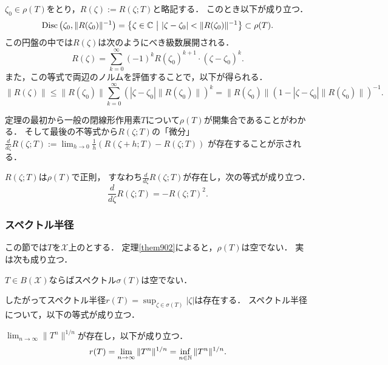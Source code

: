 \documentclass[a4j]{jsarticle}
\newcommand{\spX}{\mathscr{X}}
\begin{document}
    \begin{Them}[定理9.5, p.211]
        $\zeta_0 \in \rho(T)$をとり，$R(\zeta):=R(\zeta;T)$と略記する．
        このとき以下が成り立つ．
        \[
            \mathrm{Disc} \left(\zeta_0, \|R(\zeta_0)\|^{-1} \right)
            =\left\{ \zeta \in \mathbb{C} ~\middle|~ |\zeta-\zeta_0|<\|R(\zeta_0)\|^{-1} \right\}
            \subset \rho(T).
        \]
        この円盤の中では$R(\zeta)$は次のようにべき級数展開される．
        \[ R(\zeta)=\sum_{k=0}^{\infty} (-1)^kR(\zeta_0)^{k+1} \cdot (\zeta-\zeta_0)^k. \]
        また，この等式で両辺のノルムを評価することで，以下が得られる．
        \[
            \|R(\zeta)\|
            \leq \|R(\zeta_0)\| \sum_{k=0}^{\infty}\left( |\zeta-\zeta_0|\|R(\zeta_0)\| \right)^k
            =\|R(\zeta_0)\| (1-|\zeta-\zeta_0|\|R(\zeta_0)\|)^{-1}.
        \]
    \end{Them}
    定理の最初から一般の閉線形作用素$T$について$\rho(T)$が開集合であることがわかる．
    そして最後の不等式から$R(\zeta;T)$の「微分」$\frac{d}{d \zeta}R(\zeta;T):=\lim_{h \to 0}\frac{1}{h} (R(\zeta+h;T)-R(\zeta;T))$
    が存在することが示される．

    \begin{Them}[定理9.6, p.212]
        $R(\zeta;T)$は$\rho(T)$で正則，
        すなわち$\frac{d}{d \zeta}R(\zeta;T)$が存在し，次の等式が成り立つ．
        \[ \frac{d}{d \zeta}R(\zeta;T)=-R(\zeta;T)^2. \]
    \end{Them}

    \subsubsection{スペクトル半径}
    この節では$T$を$\spX$上のとする．
    定理\ref{them902}によると，$\rho(T)$は空でない．
    実は次も成り立つ．
    \begin{Them}[定理9.8, p.213]
        $T \in B(\spX)$ならばスペクトル$\sigma(T)$は空でない．
    \end{Them}
    したがってスペクトル半径$r(T)=\sup_{\zeta \in \sigma(T)}|\zeta|$は存在する．
    スペクトル半径について，以下の等式が成り立つ．
    \begin{Them}[定理9.12, p.215] \label{them912}
        $\lim_{n \to \infty} \|T^n\|^{1/n}$が存在し，以下が成り立つ．
        \[ r(T)=\lim_{n \to \infty} \|T^n\|^{1/n}=\inf_{n \in \mathbb{N}} \|T^n\|^{1/n}. \]
    \end{Them}
\end{document}
